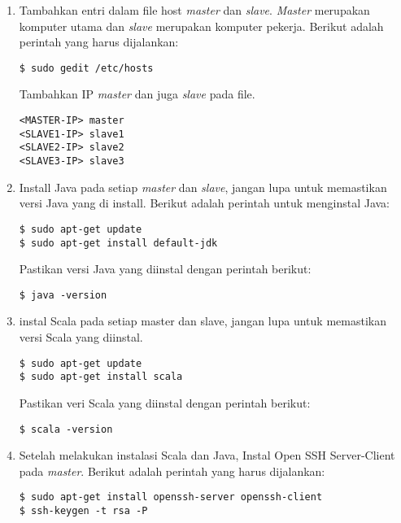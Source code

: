 \begin{enumerate}

\item Tambahkan entri dalam file host \textit{master} dan \textit{slave}. \textit{Master} merupakan komputer utama dan \textit{slave} merupakan komputer pekerja. Berikut adalah perintah yang harus dijalankan: 

\begin{verbatim}
$ sudo gedit /etc/hosts
\end{verbatim}

Tambahkan IP \textit{master} dan juga \textit{slave} pada file.

\begin{verbatim}
<MASTER-IP> master
<SLAVE1-IP> slave1
<SLAVE2-IP> slave2
<SLAVE3-IP> slave3
\end{verbatim}

\item Install Java pada setiap \textit{master} dan \textit{slave}, jangan lupa untuk memastikan versi Java yang di install. Berikut adalah perintah untuk menginstal Java:

\begin{verbatim}
$ sudo apt-get update
$ sudo apt-get install default-jdk
\end{verbatim}

Pastikan versi Java yang diinstal dengan perintah berikut:

\begin{verbatim}
$ java -version
\end{verbatim}

\item instal Scala pada setiap master dan slave, jangan lupa untuk memastikan versi Scala yang diinstal.

\begin{verbatim}
$ sudo apt-get update
$ sudo apt-get install scala
\end{verbatim}

Pastikan veri Scala yang diinstal dengan perintah berikut:

\begin{verbatim}
$ scala -version
\end{verbatim}

\item Setelah melakukan instalasi Scala dan Java, Instal Open SSH Server-Client pada \textit{master}. Berikut adalah perintah yang harus dijalankan:

\begin{verbatim}
$ sudo apt-get install openssh-server openssh-client
$ ssh-keygen -t rsa -P 
\end{verbatim}


\end{enumerate}
